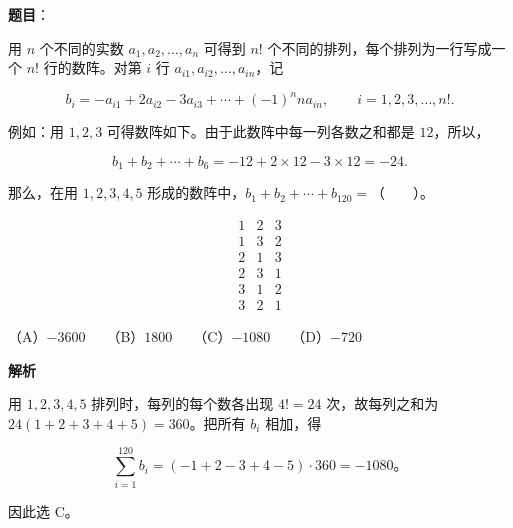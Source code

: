 \begin{answer}

\textbf{题目}：

用 $n$ 个不同的实数 $a_1,a_2,\ldots,a_n$ 可得到 $n!$ 个不同的排列，每个排列为一行写成一个 $n!$ 行的数阵。对第 $i$ 行 $a_{i1},a_{i2},\ldots,a_{in}$，记

\nopagebreak[4]
\[b_i=-a_{i1}+2a_{i2}-3a_{i3}+\cdots+(-1)^n n a_{in},\qquad i=1,2,3,\ldots,n!.\]

例如：用 $1,2,3$ 可得数阵如下。由于此数阵中每一列各数之和都是 $12$，所以，

\nopagebreak[4]
\[b_1+b_2+\cdots+b_6=-12+2\times12-3\times12=-24.\]

那么，在用 $1,2,3,4,5$ 形成的数阵中，$b_1+b_2+\cdots+b_{120}=$\mbox{（　　）}。

\nopagebreak[4]
\[\begin{array}{ccc}
1&2&3\\
1&3&2\\
2&1&3\\
2&3&1\\
3&1&2\\
3&2&1
\end{array}\]

（A）$-3600$　　（B）$1800$　　（C）$-1080$　　（D）$-720$

\textbf{解析}

用 $1,2,3,4,5$ 排列时，每列的每个数各出现 $4!=24$ 次，故每列之和为 $24(1+2+3+4+5)=360$。把所有 $b_i$ 相加，得

\nopagebreak[4]
\[
\sum_{i=1}^{120}b_i
=(-1+2-3+4-5)\cdot360=-1080\mbox{。}
\]

因此选 C。


\end{answer}

